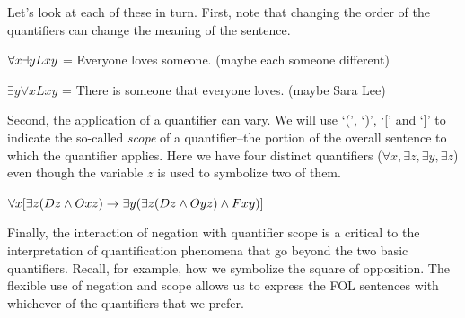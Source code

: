 Let's look at each of these in turn. First, note that changing the order of the
quantifiers can change the meaning of the sentence.

\begin{argument}
\item[ ] $\forall x\exists y Lxy$ = Everyone loves someone. (maybe each
  someone different)
\item[ ] $\exists y\forall x Lxy$ = There is someone that everyone loves.
  (maybe Sara Lee) 
\end{argument}

Second, the application of a quantifier can vary. We will use `(', `)', `[' and
`]' to indicate the so-called \emph{scope} of a quantifier--the portion of the
overall sentence to which the quantifier applies. Here we have four distinct
quantifiers ($\forall x,\exists z,\exists y,\exists z$) even though the variable
$z$ is used to symbolize two of them.

\begin{argument}
\item[ ] $\forall x[\exists z(Dz\wedge Oxz) \rightarrow
  \exists y(\exists z(Dz\wedge Oyz) \wedge Fxy)]$
\end{argument}

Finally, the interaction of negation with quantifier scope is a critical to the
interpretation of quantification phenomena that go beyond the two basic
quantifiers. Recall, for example, how we symbolize the square of opposition. The
flexible use of negation and scope allows us to express the FOL sentences with
whichever of the quantifiers that we prefer.


